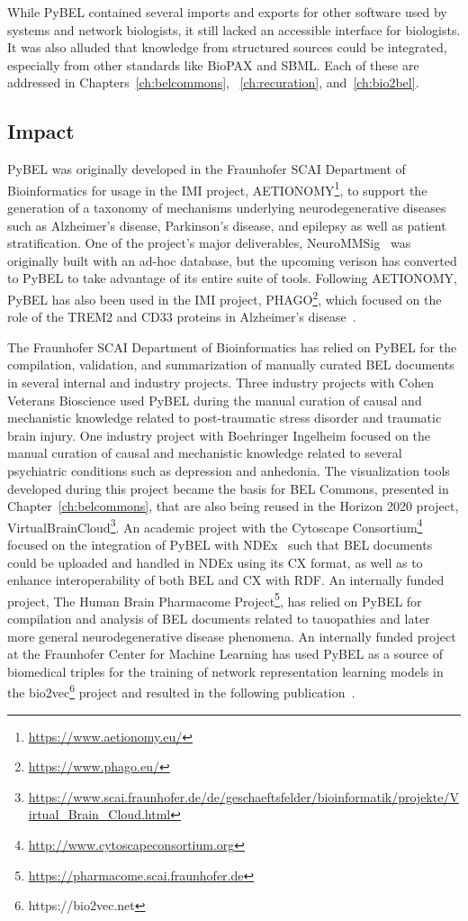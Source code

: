 While PyBEL contained several imports and exports for other software used by systems and network biologists, it still lacked an accessible interface for biologists.
It was also alluded that knowledge from structured sources could be integrated, especially from other standards like \ac{BioPAX} and \ac{SBML}.
Each of these are addressed in Chapters~\ref{ch:belcommons}, ~\ref{ch:recuration}, and~\ref{ch:bio2bel}.

\subsection*{Impact}

PyBEL was originally developed in the Fraunhofer SCAI Department of Bioinformatics for usage in the \ac{IMI} project, AETIONOMY\footnote{\url{https://www.aetionomy.eu/}}, to support the generation of a taxonomy of mechanisms underlying neurodegenerative diseases such as Alzheimer's disease, Parkinson's disease, and epilepsy as well as patient stratification.
One of the project's major deliverables, NeuroMMSig~\cite{Domingo-Fernandez2017} was originally built with an ad-hoc database, but the upcoming verison has converted to PyBEL to take advantage of its entire suite of tools.
Following AETIONOMY, PyBEL has also been used in the \ac{IMI} project, PHAGO\footnote{\url{https://www.phago.eu/}}, which focused on the role of the TREM2 and CD33 proteins in Alzheimer's disease~\cite{Ebeling2017}.

The Fraunhofer SCAI Department of Bioinformatics has relied on PyBEL for the compilation, validation, and summarization of manually curated BEL documents in several internal and industry projects.
Three industry projects with Cohen Veterans Bioscience used PyBEL during the manual curation of causal and mechanistic knowledge related to post-traumatic stress disorder and traumatic brain injury.
One industry project with Boehringer Ingelheim focused on the manual curation of causal and mechanistic knowledge related to several psychiatric conditions such as depression and anhedonia.
The visualization tools developed during this project became the basis for BEL Commons, presented in Chapter~\ref{ch:belcommons}, that are also being reused in the Horizon 2020 project, VirtualBrainCloud\footnote{\url{https://www.scai.fraunhofer.de/de/geschaeftsfelder/bioinformatik/projekte/Virtual_Brain_Cloud.html}}.
An academic project with the Cytoscape Consortium\footnote{\url{http://www.cytoscapeconsortium.org}} focused on the integration of PyBEL with NDEx~\cite{Pratt2015} such that BEL documents could be uploaded and handled in NDEx using its CX format, as well as to enhance interoperability of both \ac{BEL} and CX with \ac{RDF}.
An internally funded project, The Human Brain Pharmacome Project\footnote{\url{https://pharmacome.scai.fraunhofer.de}}, has relied on PyBEL for compilation and analysis of BEL documents related to tauopathies and later more general neurodegenerative disease phenomena.
An internally funded project at the Fraunhofer Center for Machine Learning has used PyBEL as a source of biomedical triples for the training of network representation learning models in the bio2vec\footnote{https://bio2vec.net} project and resulted in the following publication~\cite{Ali2019}.

